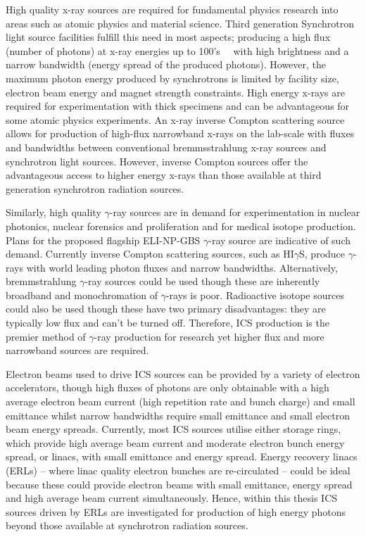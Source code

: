 \documentclass[11pt,oneside]{thesisformat}
\begin{document}
High quality x-ray sources are required for fundamental physics research into areas such as atomic physics and material science. Third generation Synchrotron light source facilities fulfill this need in most aspects; producing a high flux (number of photons) at x-ray energies up to 100's~\si{\kilo\electronvolts} with high brightness and a narrow bandwidth (energy spread of the produced photons). However, the maximum photon energy produced by synchrotrons is limited by facility size, electron beam energy and magnet strength constraints. High energy x-rays are required for experimentation with thick specimens and can be advantageous for some atomic physics experiments. %
An x-ray inverse Compton scattering source allows for production of high-flux narrowband x-rays on the lab-scale with fluxes and bandwidths between conventional bremmsstrahlung x-ray sources and synchrotron light sources. However, inverse Compton sources offer the advantageous access to higher energy x-rays than those available at third generation synchrotron radiation sources. 

Similarly, high quality $\gamma$-ray sources are in demand for experimentation in nuclear photonics, nuclear forensics and proliferation and for medical isotope production. Plans for the proposed flagship ELI-NP-GBS $\gamma$-ray source are indicative of such demand. Currently inverse Compton scattering sources, such as HI$\gamma$S, produce $\gamma$-rays with world leading photon fluxes and narrow bandwidths. Alternatively, bremmstrahlung $\gamma$-ray sources could be used though these are inherently broadband and monochromation of $\gamma$-rays is poor. Radioactive isotope sources could also be used though these have two primary disadvantages: they are typically low flux and can't be turned off. Therefore, ICS production is the premier method of $\gamma$-ray production for research yet higher flux and more narrowband sources are required.

Electron beams used to drive ICS sources can be provided by a variety of electron accelerators, though high fluxes of photons are only obtainable with a high average electron beam current (high repetition rate and bunch charge) and small emittance whilst narrow bandwidths require small emittance and small electron beam energy spreads. Currently, most ICS sources utilise either storage rings, which provide high average beam current and moderate electron bunch energy spread, or linacs, with small emittance and energy spread. Energy recovery linacs (ERLs) -- where linac quality electron bunches are re-circulated --  could be ideal because these could provide electron beams with small emittance, energy spread and high average beam current simultaneously. Hence, within this thesis ICS sources driven by ERLs are investigated for production of high energy photons beyond those available at synchrotron radiation sources.      
\end{document}
